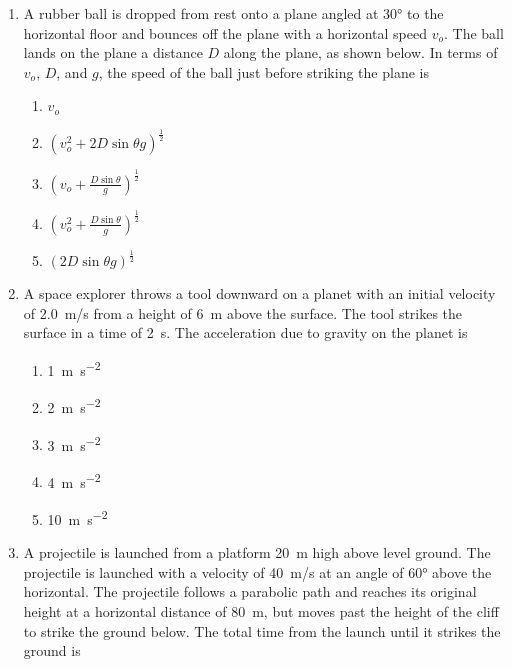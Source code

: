 \documentclass{../../oss-apphys}
\begin{document}
\begin{multicols}{2}
\begin{enumerate}[resume,leftmargin=18pt]
  \item A rubber ball is dropped from rest onto a plane angled at \ang{30} to
    the horizontal floor and bounces off the plane with a horizontal speed
    $v_o$. The ball lands on the plane a distance $D$ along the plane, as shown
    below. In terms of $v_o$, $D$, and $g$, the speed of the ball just before
    striking the plane is
    \begin{center}
    \end{center}
    \begin{enumerate}[noitemsep,topsep=0pt,leftmargin=18pt,label=(\Alph*)]
    \item $v_o$
    \item $\displaystyle\left(v_o^2+2D\sin\theta g\right)^\frac{1}{2}$
    \item $\displaystyle\left(v_o+\frac{D\sin\theta}{g}\right)^\frac{1}{2}$
    \item $\displaystyle\left(v_o^2+\frac{D\sin\theta}{g}\right)^\frac{1}{2}$
    \item $\displaystyle\left(2D\sin\theta g\right)^\frac{1}{2}$
    \end{enumerate}
    
  \item A space explorer throws a tool downward on a planet with an initial
    velocity of \SI{2.0}{m/s} from a height of \SI{6}{m} above the surface. The
    tool strikes the surface in a time of \SI{2}{\second}. The acceleration due to
    gravity on the planet is
    \begin{enumerate}[noitemsep,topsep=0pt,leftmargin=18pt,label=(\Alph*)]
    \item\SI{1 }{\metre\per\second^2}
    \item\SI{2 }{\metre\per\second^2}
    \item\SI{3 }{\metre\per\second^2}
    \item\SI{4 }{\metre\per\second^2}
    \item\SI{10}{\metre\per\second^2}
    \end{enumerate}
    \columnbreak
    
  \item A projectile is launched from a platform \SI{20}{m} high above level
    ground. The projectile is launched with a velocity of \SI{40}{m/s} at an
    angle of \ang{60} above the horizontal. The projectile follows a parabolic
    path and reaches its original height at a horizontal distance of \SI{80}{m},
    but moves past the height of the cliff to strike the ground below. The total
    time from the launch until it strikes the ground is


\end{enumerate}
\end{multicols}
\end{document}
